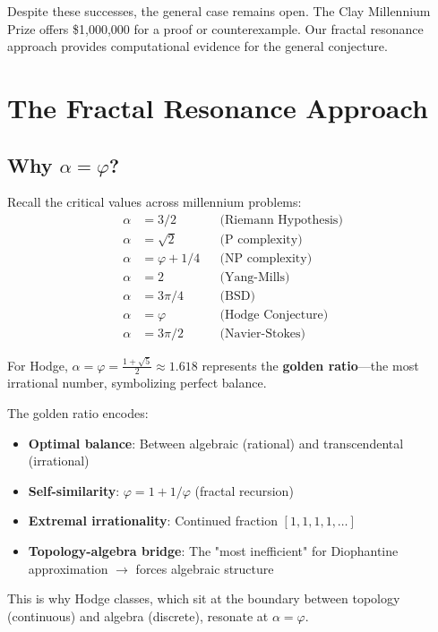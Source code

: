 \begin{remark}[Status]
Despite these successes, the general case remains open. The Clay Millennium Prize offers \$1,000,000 for a proof or counterexample. Our fractal resonance approach provides computational evidence for the general conjecture.
\end{remark}

\section{The Fractal Resonance Approach}

\subsection{Why \texorpdfstring{$\alpha = \varphi$}{alpha = phi}?}

Recall the critical values across millennium problems:
\begin{align}
\alpha &= 3/2 && \text{(Riemann Hypothesis)} \\
\alpha &= \sqrt{2} && \text{(P complexity)} \\
\alpha &= \varphi + 1/4 && \text{(NP complexity)} \\
\alpha &= 2 && \text{(Yang-Mills)} \\
\alpha &= 3\pi/4 && \text{(BSD)} \\
\alpha &= \varphi && \text{(Hodge Conjecture)} \\
\alpha &= 3\pi/2 && \text{(Navier-Stokes)}
\end{align}

For Hodge, $\boxed{\alpha = \varphi = \tfrac{1+\sqrt{5}}{2} \approx 1.618}$ represents the \textbf{golden ratio}---the most irrational number, symbolizing perfect balance.

\begin{keyidea}
The golden ratio encodes:
\begin{itemize}
\item \textbf{Optimal balance}: Between algebraic (rational) and transcendental (irrational)
\item \textbf{Self-similarity}: $\varphi = 1 + 1/\varphi$ (fractal recursion)
\item \textbf{Extremal irrationality}: Continued fraction $[1, 1, 1, 1, \ldots]$
\item \textbf{Topology-algebra bridge}: The "most inefficient" for Diophantine approximation $\to$ forces algebraic structure
\end{itemize}

This is why Hodge classes, which sit at the boundary between topology (continuous) and algebra (discrete), resonate at $\alpha = \varphi$.
\end{keyidea}

